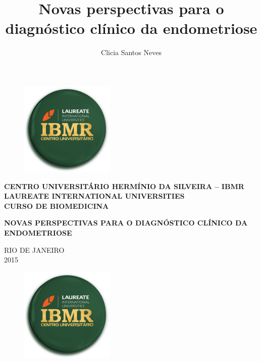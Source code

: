 \documentclass[12pt]{article} %
\title{Novas perspectivas para o diagnóstico clínico da endometriose}
\author{Clicia Santos Neves}
\begin{document}
\begin{figure}[h!]
\centering
\includegraphics[width=4.5cm]{ibmr.png}
\end{figure}

\begin{center}
\textbf{CENTRO UNIVERSITÁRIO HERMÍNIO DA SILVEIRA – IBMR \\
LAUREATE INTERNATIONAL UNIVERSITIES \\
CURSO DE BIOMEDICINA}
\end{center}

\vspace{2.5cm}

\begin{center}
\MakeUppercase{\theauthor}
\end{center}

\vspace{3.5cm}

\begin{center}
\MakeUppercase{\textbf{Novas perspectivas para o diagnóstico clínico da endometriose}}
\end{center}

\vspace{5.5cm}

\begin{center}
\MakeUppercase{Rio de Janeiro}\\
2015
\end{center}

\newpage


\begin{figure}[h!]
\centering
\includegraphics[width=4.5cm]{ibmr.png}
\end{figure}
\end{document}
